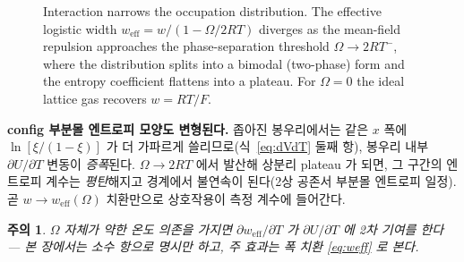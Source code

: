 \documentclass[11pt,a4paper]{article}
\newtheorem*{warnbox}{주의}
\newcommand{\eff}{\mathrm{eff}}
\begin{document}
\begin{figure}[t]
\centering
{}
\caption{Interaction narrows the occupation distribution. The effective logistic width
$w_\mathrm{eff}=w/(1-\Omega/2RT)$ diverges as the mean-field repulsion approaches the
phase-separation threshold $\Omega\to2RT^-$, where the distribution splits into a bimodal
(two-phase) form and the entropy coefficient flattens into a plateau. For $\Omega=0$ the ideal
lattice gas recovers $w=RT/F$.}
\label{fig:weff}
\end{figure}

\textbf{config 부분몰 엔트로피 모양도 변형된다.} 좁아진 봉우리에서는 같은 $x$ 폭에 $\ln[\xi/(1-\xi)]$ 가
더 가파르게 쓸리므로(식~\eqref{eq:dVdT} 둘째 항), 봉우리 내부 $\partial U/\partial T$ 변동이
\emph{증폭}된다. $\Omega\to2RT$ 에서 발산해 상분리 plateau 가 되면, 그 구간의 엔트로피 계수는
\emph{평탄}해지고 경계에서 불연속이 된다(2상 공존서 부분몰 엔트로피 일정). 곧 $w\to w_\eff(\Omega)$
치환만으로 상호작용이 측정 계수에 들어간다.

\begin{warnbox}
$\Omega$ 자체가 약한 온도 의존을 가지면 $\partial w_\eff/\partial T$ 가 $\partial U/\partial T$ 에 2차
기여를 한다 — 본 장에서는 소수 항으로 명시만 하고, 주 효과는 폭 치환 \eqref{eq:weff} 로 본다.
\end{warnbox}
\end{document}
